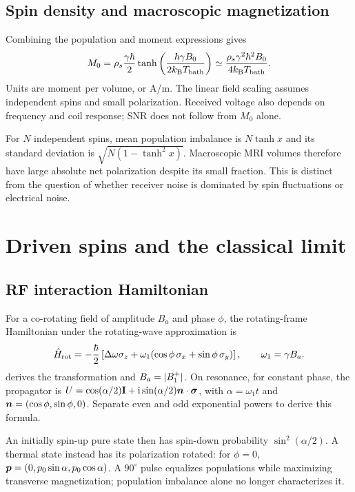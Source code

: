 \subsection{Spin density and macroscopic magnetization}
Combining the population and moment expressions gives
\begin{equation}
 M_0=\rho_s\frac{\gamma\hbar}{2}
       \tanh\left(\frac{\hbar\gamma B_0}{2k_{\rm B}T_{\rm bath}}\right)
 \simeq \frac{\rho_s\gamma^2\hbar^2B_0}{4k_{\rm B}T_{\rm bath}} .
 \label{eq:02:curie}
\end{equation}
Units are moment per volume, or A/m. The linear field scaling assumes
independent spins and small polarization. Received voltage also depends
on frequency and coil response; SNR does not follow from $M_0$ alone.

For $N$ independent spins, mean population imbalance is $N\tanh x$
and its standard deviation is $\sqrt{N(1-\tanh^2x)}$.
Macroscopic MRI volumes therefore have large absolute net polarization
despite its small fraction. This is distinct from the question of whether
receiver noise is dominated by spin fluctuations or electrical noise.

\section{Driven spins and the classical limit}
\label{sec:02:driven-spins-and-the-classical-limit}
\subsection{RF interaction Hamiltonian}
For a co-rotating field of amplitude $B_a$ and phase $\phi$, the
rotating-frame Hamiltonian under the rotating-wave approximation is
\[
 \hat{H}_{\rm rot}=-\frac{\hbar}{2}\left[
 \Delta\omega\sigma_z+\omega_1(\cos\phi\,\sigma_x+\sin\phi\,\sigma_y)\right],
 \qquad\omega_1=\gamma B_a .
\]
 derives the transformation and $B_a=\lvert B_{1}^{+}\rvert$.
On resonance, for constant phase, the propagator is
$U=\cos(\alpha/2)\mathbf{I}+\mathrm{i}\sin(\alpha/2)\bm{n}\cdot\bm{\sigma}$,
with $\alpha=\omega_1t$ and $\bm{n}=(\cos\phi,\sin\phi,0)$.
Separate even and odd exponential powers to derive this formula.

An initially spin-up pure state then has spin-down probability
$\sin^2(\alpha/2)$. A thermal state instead has its polarization rotated:
for $\phi=0$,
$\bm{p}=(0,p_0\sin\alpha,p_0\cos\alpha)$.
A $90^\circ$ pulse equalizes populations while maximizing transverse
magnetization; population imbalance alone no longer characterizes it.

